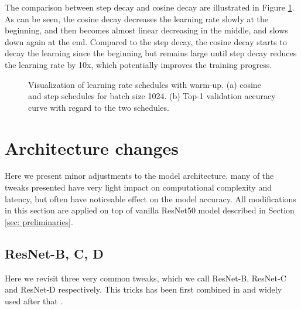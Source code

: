 The comparison between step decay and cosine decay are illustrated in Figure \ref{fig:learning-rate-curve}. As can be seen, the cosine decay decreases the learning rate slowly at the beginning, and then becomes almost linear decreasing in the middle, and slows down again at the end. Compared to the step decay, the cosine decay starts to decay the learning since the beginning but remains large until step decay reduces the learning rate by 10x, which potentially improves the training progress.

\begin{figure}[t!]
  \centering
  \caption{Visualization of learning rate schedules with warm-up. (a) cosine and step schedules for batch size 1024. (b) Top-1 validation accuracy curve with regard to the two schedules.}
  \label{fig:learning-rate-curve}
\end{figure}







\section{Architecture changes}

Here we present minor adjustments to the model architecture, many of the tweaks presented have very light impact on computational complexity and latency, but often have noticeable effect on the model accuracy. All modifications in this section are applied on top of vanilla ResNet50 model described in Section \ref{sec: preliminaries}.

\subsection{ResNet-B, C, D}
Here we revisit three very common tweaks, which we call ResNet-B, ResNet-C and ResNet-D respectively. This tricks has been first combined in \cite{he2019_bag_of_tricks} and widely used after that \cite{ridnik2021_tresnet} \cite{bello2021_revisiting_resnet}. 

